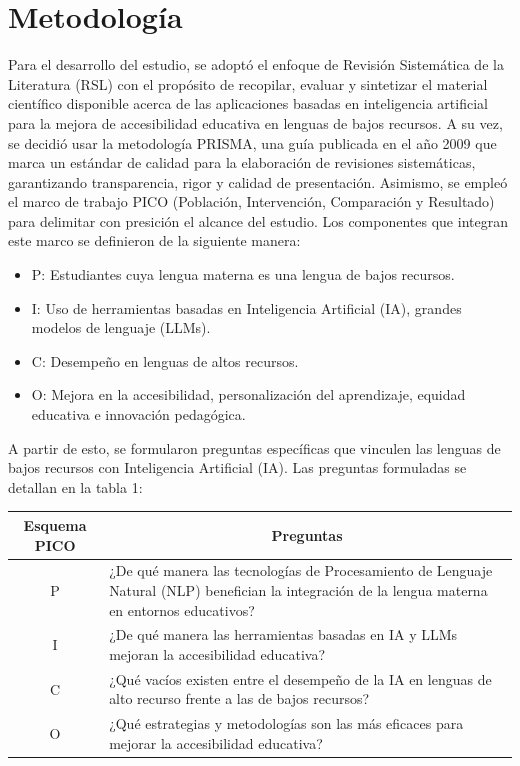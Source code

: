 \section{Metodología}

Para el desarrollo del estudio, se adoptó el enfoque de Revisión Sistemática de la Literatura (RSL) con el propósito de recopilar, evaluar y sintetizar el material científico disponible acerca de las aplicaciones basadas en inteligencia artificial para la mejora de accesibilidad educativa en lenguas de bajos recursos. A su vez, se decidió usar la metodología PRISMA, una guía publicada en el año 2009 que marca un estándar de calidad para la elaboración de revisiones sistemáticas, garantizando transparencia, rigor y calidad de presentación. 
Asimismo, se empleó el marco de trabajo PICO (Población, Intervención, Comparación y Resultado) para delimitar con presición el alcance del estudio. Los componentes que integran este marco se definieron de la siguiente manera:

\begin{itemize}
   \item P: Estudiantes cuya lengua materna es una lengua de bajos recursos.
   \item I: Uso de herramientas basadas en Inteligencia Artificial (IA), grandes modelos de lenguaje (LLMs).
   \item C: Desempeño en lenguas de altos recursos.
   \item O: Mejora en la accesibilidad, personalización del aprendizaje, equidad educativa e innovación pedagógica.
\end{itemize}

A partir de esto, se formularon preguntas específicas que vinculen las lenguas de bajos recursos con Inteligencia Artificial (IA). Las preguntas formuladas se detallan en la tabla 1:


\begin{table}[H]
\centering
{}
\small
    \begin{tabular}{cp{4.6cm}}
    \toprule
    \multicolumn{1}{c}{\textbf{Esquema PICO}} & \multicolumn{1}{c}{\textbf{Preguntas}} \\
    \midrule
    P & ¿De qué manera las tecnologías de Procesamiento de Lenguaje Natural (NLP) benefician la integración de la lengua materna en entornos educativos? \\ \addlinespace
    I & ¿De qué manera las herramientas basadas en IA y LLMs mejoran la accesibilidad educativa? \\ \addlinespace
    C & ¿Qué vacíos existen entre el desempeño de la IA en lenguas de alto recurso frente a las de bajos recursos? 
 \\ \addlinespace
    O & ¿Qué estrategias y metodologías son las más eficaces para mejorar la accesibilidad educativa?
 \\
    \bottomrule
    \end{tabular}%
  \label{tabla1}%
\end{table}

